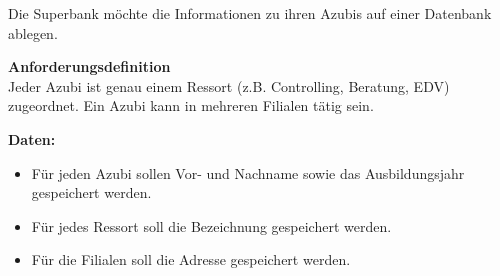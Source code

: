 \documentclass[a4paper,12pt, headsepline, ngerman]{scrartcl}
\begin{document}
	
	\begin{Exercise}[title={Erstelle ein ERM zu folgendem Sachverhalt. (9P)}, label=KAERMAufstellen]
		
		Die Superbank möchte die Informationen zu ihren Azubis auf einer Datenbank ablegen.
		
		\textbf{Anforderungsdefinition}\\
		Jeder Azubi ist genau einem Ressort (z.B. Controlling, Beratung, EDV) zugeordnet. Ein Azubi kann in mehreren Filialen tätig sein.
		
		\textbf{Daten:}
		\begin{itemize}
			\item Für jeden Azubi sollen Vor- und Nachname sowie das Ausbildungsjahr gespeichert werden.
			\item Für jedes Ressort soll die Bezeichnung gespeichert werden.
			\item Für die Filialen soll die Adresse gespeichert werden.
		\end{itemize}	
	\end{Exercise}%

	
	
	
	
	
	
	
	
\end{document}

